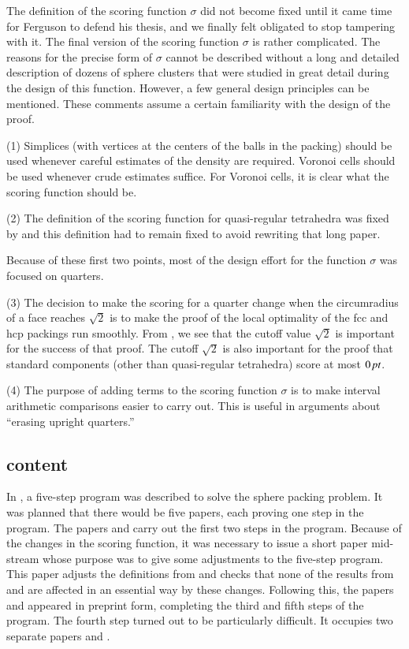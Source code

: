 The definition of the scoring function $\sigma$ did not become
fixed until it came time for Ferguson to defend his thesis, and we
finally felt obligated to stop tampering with it.  The final
version of the scoring function $\sigma$ is rather complicated.
The reasons for the precise form of $\sigma$ cannot be described
without a long and detailed description of dozens of sphere
clusters that were studied in great detail during the design of
this function. However, a few general design principles can be
mentioned.  These comments assume a certain familiarity with the
design of the proof.


(1) Simplices (with vertices at the centers of the balls in the
packing) should be used whenever careful estimates of the density
are required.  Voronoi cells should be used whenever crude
estimates suffice.  For Voronoi cells, it is clear what the
scoring function should be.



(2) The definition of the scoring function for quasi-regular
tetrahedra was fixed by \cite{part1} and this definition had to
remain fixed to avoid rewriting that long paper.

Because of these first two points, most of the design effort for
the function $\sigma$ was focused on quarters.

(3)  The decision to make the scoring for a quarter change when
the circumradius of a face reaches $\sqrt2$ is to make the proof
of the local optimality of the fcc and hcp packings run smoothly.
From \cite{part2}, we see that the cutoff value $\sqrt2$ is
important for the success of that proof.  The cutoff $\sqrt2$ is
also important for the proof that standard components (other than
quasi-regular tetrahedra) score at most $0\,\hbox{\it pt}$.

(4) The purpose of adding terms to the scoring function $\sigma$
is to make
interval arithmetic comparisons
easier to carry out.  This is useful in arguments about ``erasing
upright quarters.''

\subsection{content}

In \cite{part1}, a five-step program was described to solve the
sphere packing problem.  It was planned that there would be five
papers, each proving one step in the program.  The papers
\cite{part1} and \cite{part2} carry out the first two steps in the
program. Because of the changes in the scoring function, it was
necessary to issue a short paper \cite{Form} mid-stream whose
purpose was to give some adjustments to the five-step program.
This paper adjusts the definitions from \cite{part1} and checks
that none of the results from \cite{part1} and \cite{part2} are
affected in an essential way by these changes. Following this, the
papers \cite{Hal98B} and \cite{Fer97} appeared in preprint form,
completing the third and fifth steps of the program. The fourth
step turned out to be particularly difficult. It occupies two
separate papers \cite{Hal98C} and \cite{Hal98D}.

